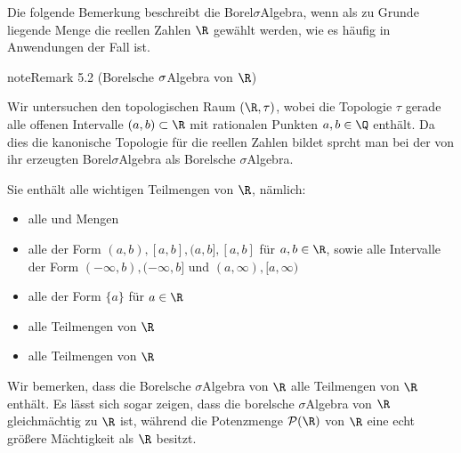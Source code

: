 \documentclass[letterpaper,10pt,english]{jupyterBook}
\begin{document}
\sphinxAtStartPar
Die folgende Bemerkung beschreibt die Borel\sphinxhyphen{}\(\sigma\)\sphinxhyphen{}Algebra, wenn als zu Grunde liegende Menge die reellen Zahlen \(\R\) gewählt werden, wie es häufig in Anwendungen der Fall ist.
\label{masstheorie/masstheorie:remark-8}
\begin{sphinxadmonition}{note}{Remark 5.2 (Borelsche \protect\(\sigma\protect\)\sphinxhyphen{}Algebra von \protect\(\R\protect\))}



\sphinxAtStartPar
Wir untersuchen den topologischen Raum \((\R, \tau)\), wobei die Topologie \(\tau\) gerade alle offenen Intervalle \((a,b) \subset \R\) mit rationalen Punkten \(a,b \in \Q\) enthält.
Da dies die kanonische Topologie für die reellen Zahlen bildet sprcht man bei der von ihr erzeugten Borel\sphinxhyphen{}\(\sigma\)\sphinxhyphen{}Algebra als  Borelsche \(\sigma\)\sphinxhyphen{}Algebra.

\sphinxAtStartPar
Sie enthält alle wichtigen Teilmengen von \(\R\), nämlich:
\begin{itemize}
\item {} 
\sphinxAtStartPar
alle  und  Mengen

\item {} 
\sphinxAtStartPar
alle  der Form \((a,b), [a,b], (a,b], [a,b]\) für \(a,b \in \R\), sowie alle Intervalle der Form \((-\infty, b), (-\infty, b]\) und \((a, \infty), [a,\infty)\)

\item {} 
\sphinxAtStartPar
alle  der Form \(\{a\}\) für \(a \in \R\)

\item {} 
\sphinxAtStartPar
alle  Teilmengen von \(\R\)

\item {} 
\sphinxAtStartPar
alle  Teilmengen von \(\R\)

\end{itemize}

\sphinxAtStartPar
Wir bemerken, dass die Borelsche \(\sigma\)\sphinxhyphen{}Algebra von \(\R\)  alle Teilmengen von \(\R\) enthält.
Es lässt sich sogar zeigen, dass die borelsche \(\sigma\)\sphinxhyphen{}Algebra von \(\R\) gleichmächtig zu \(\R\) ist, während die Potenzmenge \(\mathcal{P}(\R)\) von \(\R\) eine echt größere Mächtigkeit als \(\R\) besitzt.
\end{sphinxadmonition}
\end{document}
